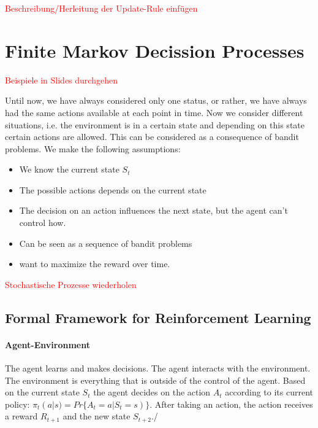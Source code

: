 \documentclass[10pt,a4paper]{article}
\begin{document}
\textcolor{red}{Beschreibung/Herleitung der Update-Rule einfügen}

\section{Finite Markov Decission Processes}
\textcolor{red}{Beispiele in Slides durchgehen}

Until now, we have always considered only one status, or rather, we have always had the same actions available at each point in time. Now we consider different situations, i.e. the environment is in a certain state and depending on this state certain actions are allowed.
This can be considered as a consequence of bandit problems. We make the following assumptions:
\begin{itemize}
\item We know the current state $S_t$
\item The possible actions depends on the current state
\item The decision on an action influences the next state, but the agent can't control how.
\item Can be seen as a sequence of bandit problems
\item want to maximize the reward over time.
\end{itemize}
\textcolor{red}{Stochastische Prozesse wiederholen}

\subsection{Formal Framework for Reinforcement Learning}
\paragraph{Agent-Environment}


The agent learns and makes decisions. The agent interacts with the environment. The environment is everything that is outside of the control of the agent. Based on the current state $S_t$ the agent decides on the action $A_t$ according to its current policy: $\pi_t(a | s) = Pr \{ A_t = a | S_t = s) \}$. After taking an action, the action receives a reward $R_{t+1}$ and the new state $S_{t+2}$./
\end{document}
